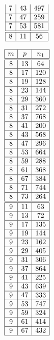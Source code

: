 \documentclass[a4paper, 10pt]{article}
\begin{document}
\begin{center}
\begin{minipage}[t]{.23\textwidth}
\begin{displaymath}
\begin{array}{|c|c|c|}
7 & 43 & 497 \\ \hline
7 & 47 & 259 \\ \hline
7 & 53 & 581 \\ \hline
\hline
8 & 11 & 56 \\ \hline
\end{array}
\end{displaymath}
\end{minipage}
\begin{minipage}[t]{.23\textwidth}
\begin{displaymath}
\begin{array}{|c|c|c|}
\hline
m & p & n_{1} \\ \hline
\hline
8 & 13 & 64 \\ \hline
8 & 17 & 120 \\ \hline
8 & 19 & 128 \\ \hline
8 & 23 & 144 \\ \hline
8 & 29 & 360 \\ \hline
8 & 31 & 272 \\ \hline
8 & 37 & 768 \\ \hline
8 & 41 & 200 \\ \hline
8 & 43 & 568 \\ \hline
8 & 47 & 296 \\ \hline
8 & 53 & 664 \\ \hline
8 & 59 & 288 \\ \hline
8 & 61 & 368 \\ \hline
8 & 67 & 384 \\ \hline
8 & 71 & 744 \\ \hline
8 & 73 & 264 \\ \hline
\hline
9 & 11 & 63 \\ \hline
9 & 13 & 72 \\ \hline
9 & 17 & 135 \\ \hline
9 & 19 & 144 \\ \hline
9 & 23 & 162 \\ \hline
9 & 29 & 405 \\ \hline
9 & 31 & 306 \\ \hline
9 & 37 & 864 \\ \hline
9 & 41 & 225 \\ \hline
9 & 43 & 639 \\ \hline
9 & 47 & 333 \\ \hline
9 & 53 & 747 \\ \hline
9 & 59 & 324 \\ \hline
9 & 61 & 414 \\ \hline
9 & 67 & 432 \\ \hline

\end{array}
\end{displaymath}
\end{minipage}
\end{center}
\end{document}
